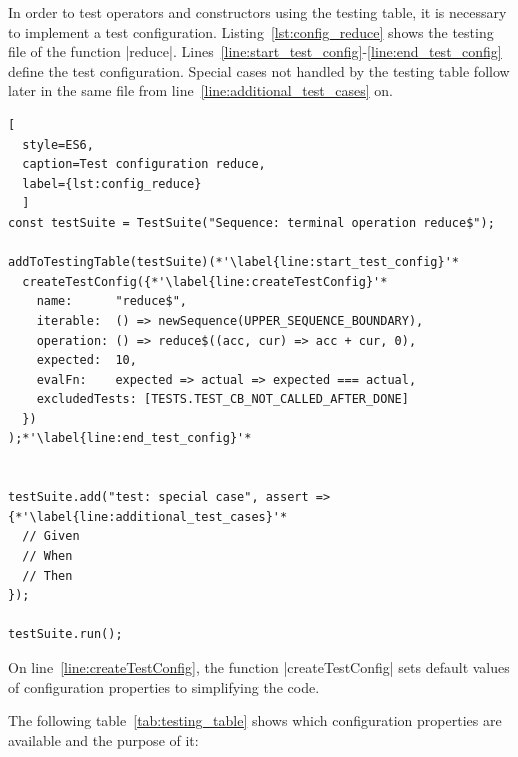 In order to test operators and constructors using the testing table, it is
necessary to implement a test configuration.
Listing~\ref{lst:config_reduce} shows the testing file of the function |reduce|. 
Lines~\ref{line:start_test_config}-\ref{line:end_test_config} define the test 
configuration. Special cases not handled by the testing table follow later in
the same file from line~\ref{line:additional_test_cases} on.

\begin{lstlisting}[
  style=ES6, 
  caption=Test configuration reduce,
  label={lst:config_reduce}
  ]
const testSuite = TestSuite("Sequence: terminal operation reduce$");

addToTestingTable(testSuite)(*'\label{line:start_test_config}'*
  createTestConfig({*'\label{line:createTestConfig}'*
    name:      "reduce$",
    iterable:  () => newSequence(UPPER_SEQUENCE_BOUNDARY),
    operation: () => reduce$((acc, cur) => acc + cur, 0),
    expected:  10,
    evalFn:    expected => actual => expected === actual,
    excludedTests: [TESTS.TEST_CB_NOT_CALLED_AFTER_DONE]
  })
);*'\label{line:end_test_config}'*


testSuite.add("test: special case", assert => {*'\label{line:additional_test_cases}'*
  // Given
  // When
  // Then
});

testSuite.run();
\end{lstlisting}

On line~\ref{line:createTestConfig}, the function |createTestConfig|  sets
default values of configuration properties to simplifying the code.

The following table~\ref{tab:testing_table} shows which configuration 
properties are available and the purpose of it:

